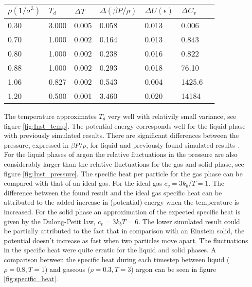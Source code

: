 \begin{center}
\centerfloat
{}
\begin{tabular}{lllllll}
\hline \hline
$\rho(1/\sigma^3)$ & $T_d$ & $\Delta T$ & $\Delta (\beta P/\rho)$ & $\Delta U(\epsilon)$ & $\Delta C_v$ \\
\hline
0.30 & 3.000 & 0.005 & 0.058 & 0.013 & 0.006\\
0.70 & 1.000 & 0.002 & 0.164 & 0.013 & 0.843\\
0.80 & 1.000 & 0.002 & 0.238 & 0.016 & 0.822\\
0.88& 1.000 & 0.002 & 0.293 & 0.018 & 76.10\\
1.06& 0.827& 0.002 & 0.543 & 0.004 & 1425.6\\
1.20 & 0.500 & 0.001 & 3.460 & 0.020 & 14184\\
\hline \hline
\end{tabular}
\vspace{-0.1cm}
\label{table:variance}
\end{center}
The temperature approximates $T_d$ very well with relativily small variance, see figure \ref{fig:Inst_temp}. The potential energy corresponds well for the liquid phase with previously simulated results. There are significant differences between the pressure, expressed in $\beta P/\rho$, for liquid and previously found simulated results \cite{jos}. For the liquid phases of argon the relative fluctuations in the pressure are also considerably larger than the relative fluctuations for the gas and solid phase, see figure \ref{fig:Inst_pressure}. The specific heat per particle for the gas phase can be compared with that of an ideal gas.  For the ideal gas $c_v = 3k_b/T = 1$. The difference between the found result and the ideal gas specific heat can be attributed to the added increase in (potential) energy when the temperature is increased. For the solid phase an approximation of the expected specific heat is given by the Dulong-Petit law, $c_v = 3k_bT =  6$. The lower simulated result could be partially attributed to the fact that in comparison with an Einstein solid, the potential doesn't increase as fast when two particles move apart. The fluctuations in the specific heat were quite erratic for the liquid and solid phases. A comparison between the specific heat during each timestep between liquid ($\rho = 0.8, T = 1$) and gaseous ($\rho = 0.3, T = 3$) argon can be seen in figure \ref{fig:specific_heat}.

